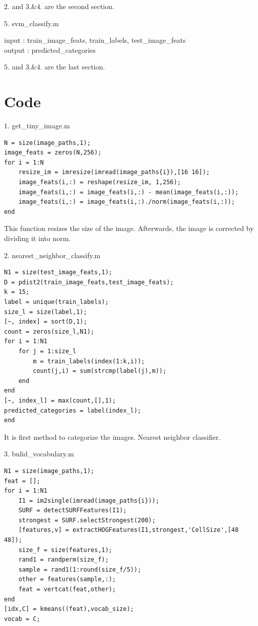 \tab $2.$ and $3.$\&$4.$ are the second section.\\

{\large $5.$ svm\_classify.m \par}
\tab input : train\_image\_feats, train\_labels, test\_image\_feats \\
\tab output : predicted\_categories 

\tab $5.$ and $3.$\&$4.$ are the last section.\\

\section*{Code}
{\large $1.$ get\_tiny\_image.m \par}
\begin{lstlisting}[style=Matlab-editor]
N = size(image_paths,1);
image_feats = zeros(N,256);
for i = 1:N
    resize_im = imresize(imread(image_paths{i}),[16 16]);
    image_feats(i,:) = reshape(resize_im, 1,256);
    image_feats(i,:) = image_feats(i,:) - mean(image_feats(i,:));
    image_feats(i,:) = image_feats(i,:)./norm(image_feats(i,:));
end
\end{lstlisting}

This function resizes the size of the image. Afterwards, the image is corrected by dividing it into norm.\\

{\large $2.$ nearest\_neighbor\_classify.m \par}
\begin{lstlisting}[style=Matlab-editor]
N1 = size(test_image_feats,1);
D = pdist2(train_image_feats,test_image_feats);
k = 15;
label = unique(train_labels);
size_l = size(label,1);
[~, index] = sort(D,1);
count = zeros(size_l,N1);
for i = 1:N1
    for j = 1:size_l
        m = train_labels(index(1:k,i));
        count(j,i) = sum(strcmp(label(j),m));
    end
end
[~, index_l] = max(count,[],1);
predicted_categories = label(index_l);
end 
\end{lstlisting}

It is first method to categorize the images. Nearest neighbor classifier.\\



\newpage
{\large $3.$ bulid\_vocabulary.m \par}
\begin{lstlisting}[style=Matlab-editor]
N1 = size(image_paths,1);
feat = [];
for i = 1:N1
    I1 = im2single(imread(image_paths{i}));
    SURF = detectSURFFeatures(I1);
    strongest = SURF.selectStrongest(200);
    [features,v] = extractHOGFeatures(I1,strongest,'CellSize',[48 48]);
    size_f = size(features,1);
    rand1 = randperm(size_f);
    sample = rand1(1:round(size_f/5));
    other = features(sample,:);
    feat = vertcat(feat,other);
end
[idx,C] = kmeans((feat),vocab_size);
vocab = C;
\end{lstlisting}

